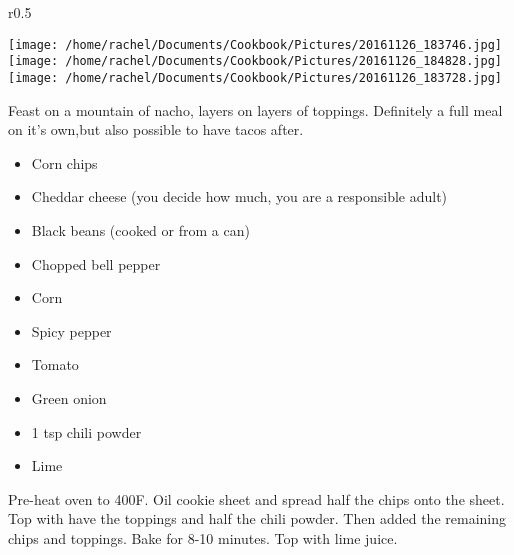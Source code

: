 \documentclass{article}
\begin{document}
\begin{wrapfigure}{r}{0.5\textwidth}
\
  \begin{center}
 	\hfill\begin{minipage}{.5\textwidth}\centering
 	\vspace*{-6cm}
		\texttt{[image: /home/rachel/Documents/Cookbook/Pictures/20161126\_183746.jpg]}
		\\[5mm]
		\texttt{[image: /home/rachel/Documents/Cookbook/Pictures/20161126\_184828.jpg]}
		\\[5mm]
		\texttt{[image: /home/rachel/Documents/Cookbook/Pictures/20161126\_183728.jpg]}

	\end{minipage}  
	\end{center}

\end{wrapfigure}


\vspace{10mm}

Feast on a mountain of nacho, layers on layers of toppings. Definitely a full meal on it's own,but also possible to have tacos after.
 
\vspace{5mm}
{\selectfont 
    \begin{itemize}[noitemsep]
    
      \item[] Corn chips
      \item[] Cheddar cheese (you decide how much, you are a responsible adult)
      \item[] Black beans (cooked or from a can)
      \item[] Chopped bell pepper
      \item[] Corn
      \item[] Spicy pepper
      \item[] Tomato
      \item[] Green onion
      \item[] 1 tsp chili powder 
      \item[] Lime
      
    \end{itemize}
    }
\vspace{5mm}
    
Pre-heat oven to 400\degree F. Oil cookie sheet and spread half the chips onto the sheet. Top with have the toppings and half the chili powder. Then added the remaining chips and toppings. Bake for 8-10 minutes. Top with lime juice.
\end{document}
